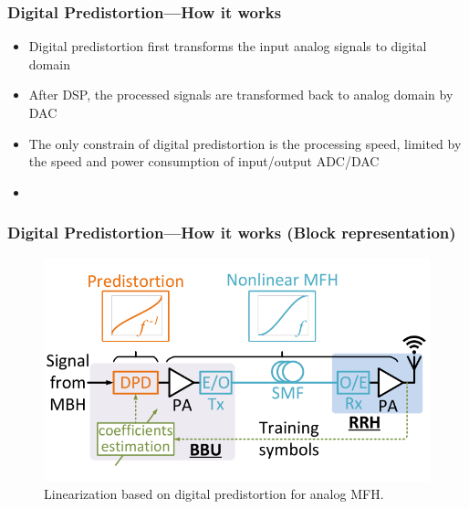 \documentclass[t]{beamer}
\begin{document}
\begin{frame}
    \frametitle{Digital Predistortion---How it works}
    \begin{itemize}
        \item Digital predistortion first transforms the input analog signals to digital domain
        \item After DSP, the processed signals are transformed back to analog domain by DAC
        \item The only constrain of digital predistortion is the processing speed, limited by the speed and power consumption of input/output ADC/DAC
        \item 
    \end{itemize}
\end{frame}

\begin{frame}
    \frametitle{Digital Predistortion---How it works (Block representation) \cite{Wang2017}}
    \begin{figure}
        \includegraphics[width=\textwidth]{predistortion}
        \caption{Linearization based on digital predistortion for analog MFH.}
        \label{predistortion}
    \end{figure}
\end{frame}
\end{document}
